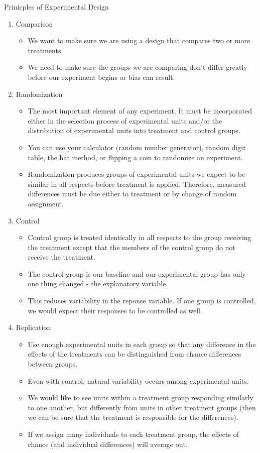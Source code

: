 \documentclass[../stats.tex]{subfiles}
\begin{document}
Prinicples of Experimental Design 
\begin{enumerate}
    \item Comparison 
    \begin{itemize}
        \item We want to make sure we are using a design that compares two or more treatments 
        \item We need to make sure the groups we are comparing don't differ greatly before our experiment begins or bias can result.
    \end{itemize}
    \item Randomization 
    \begin{itemize}
        \item The most important element of any experiment. It must be incorporated either in the selection process of experimental units and/or the distribution of experimental units into treatment and control groups.
        \item You can use your calculator (random number generator), random digit table, the hat method, or flipping a coin to randomize an experiment.
        \item Randomization produces groups of experimental units we expect to be similar in all respects before treatment is applied. Therefore, measured differences must be due either to treatment or by change of random assignment.
    \end{itemize}
    \item Control 
    \begin{itemize}
        \item Control group is treated identically in all respects to the group receiving the treatment except that the members of the control group do not receive the treatment.
        \item The control group is our baseline and our experimental group has only one thing changed - the explanatory variable.
        \item This reduces variability in the reponse variable. If one group is controlled, we would expect their responses to be controlled as well.
    \end{itemize}
    \item Replication 
    \begin{itemize}
        \item Use enough experimental units in each group so that any difference in the effects of the treatments can be distinguished from chance differences between groups.
        \item Even with control, natural variability occurs among experimental units.
        \item We would like to see units within a treatment group responding similarly to one another, but differently from units in other treatment groups (then we can be sure that the treatment is responsible for the differences).
        \item If we assign many individuals to each treatment group, the effects of chance (and individual differences) will average out.
    \end{itemize}
\end{enumerate}
\end{document}
